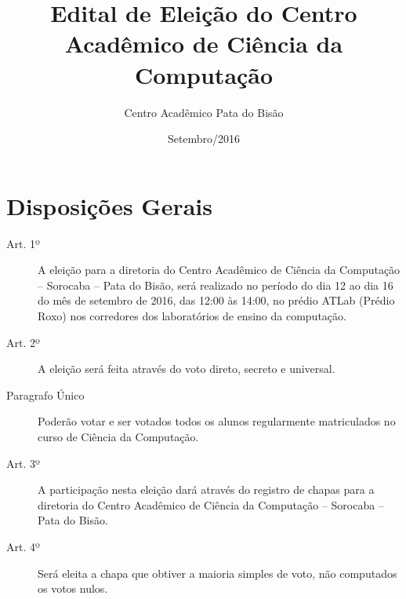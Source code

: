 \documentclass[12pt]{article}
\title{Edital de Eleição do Centro Acadêmico de Ciência da Computação}
\author{Centro Acadêmico Pata do Bisão}
\date{Setembro/2016}
\begin{document}
\maketitle

\section*{Disposições Gerais}
\begin{description}
	\item[Art. 1º] A eleição para a diretoria do Centro Acadêmico de Ciência da Computação -- Sorocaba -- Pata do Bisão, será realizado no período do dia 12 ao dia 16 do mês de setembro de 2016, das 12:00 às 14:00, no prédio ATLab (Prédio Roxo) nos corredores dos laboratórios de ensino da computação. 
	\item[Art. 2º] A eleição será feita através do voto direto, secreto e universal.
	\item[Paragrafo Único] Poderão  votar  e  ser  votados  todos  os  alunos regularmente matriculados  no  curso  de Ciência da Computação. 
	\item[Art. 3º] A participação nesta eleição dará através do registro de chapas para a diretoria do Centro Acadêmico de Ciência da Computação -- Sorocaba -- Pata do Bisão.
	\item[Art. 4º] Será eleita a chapa que obtiver a maioria simples de voto, não computados os votos nulos.
\end{description}
\end{document}
